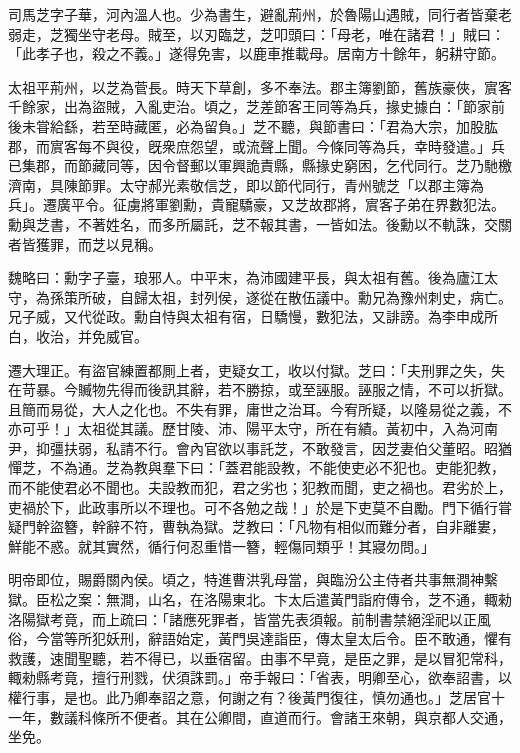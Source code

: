 
\begin{pinyinscope}
司馬芝字子華，河內溫人也。少為書生，避亂荊州，於魯陽山遇賊，同行者皆棄老弱走，芝獨坐守老母。賊至，以刃臨芝，芝叩頭曰：「母老，唯在諸君！」賊曰：「此孝子也，殺之不義。」遂得免害，以鹿車推載母。居南方十餘年，躬耕守節。

太祖平荊州，以芝為菅長。時天下草創，多不奉法。郡主簿劉節，舊族豪俠，賔客千餘家，出為盜賊，入亂吏治。頃之，芝差節客王同等為兵，掾史據白：「節家前後未甞給繇，若至時藏匿，必為留負。」芝不聽，與節書曰：「君為大宗，加股肱郡，而賔客每不與役，旣衆庶怨望，或流聲上聞。今條同等為兵，幸時發遣。」兵已集郡，而節藏同等，因令督郵以軍興詭責縣，縣掾史窮困，乞代同行。芝乃馳檄濟南，具陳節罪。太守郝光素敬信芝，即以節代同行，青州號芝「以郡主簿為兵」。遷廣平令。征虜將軍劉勳，貴寵驕豪，又芝故郡將，賔客子弟在界數犯法。勳與芝書，不著姓名，而多所屬託，芝不報其書，一皆如法。後勳以不軌誅，交關者皆獲罪，而芝以見稱。

魏略曰：勳字子臺，琅邪人。中平末，為沛國建平長，與太祖有舊。後為廬江太守，為孫策所破，自歸太祖，封列侯，遂從在散伍議中。勳兄為豫州刺史，病亡。兄子威，又代從政。勳自恃與太祖有宿，日驕慢，數犯法，又誹謗。為李申成所白，收治，并免威官。

遷大理正。有盜官練置都厠上者，吏疑女工，收以付獄。芝曰：「夫刑罪之失，失在苛暴。今贓物先得而後訊其辭，若不勝掠，或至誣服。誣服之情，不可以折獄。且簡而易從，大人之化也。不失有罪，庸世之治耳。今宥所疑，以隆易從之義，不亦可乎！」太祖從其議。歷甘陵、沛、陽平太守，所在有績。黃初中，入為河南尹，抑彊扶弱，私請不行。會內官欲以事託芝，不敢發言，因芝妻伯父董昭。昭猶憚芝，不為通。芝為教與羣下曰：「蓋君能設教，不能使吏必不犯也。吏能犯教，而不能使君必不聞也。夫設教而犯，君之劣也；犯教而聞，吏之禍也。君劣於上，吏禍於下，此政事所以不理也。可不各勉之哉！」於是下吏莫不自勵。門下循行甞疑門幹盜簪，幹辭不符，曹執為獄。芝教曰：「凡物有相似而難分者，自非離婁，鮮能不惑。就其實然，循行何忍重惜一簪，輕傷同類乎！其寢勿問。」

明帝即位，賜爵關內侯。頃之，特進曹洪乳母當，與臨汾公主侍者共事無澗神繫獄。臣松之案：無澗，山名，在洛陽東北。卞太后遣黃門詣府傳令，芝不通，輙勑洛陽獄考竟，而上疏曰：「諸應死罪者，皆當先表須報。前制書禁絕淫祀以正風俗，今當等所犯妖刑，辭語始定，黃門吳達詣臣，傳太皇太后令。臣不敢通，懼有救護，速聞聖聽，若不得已，以垂宿留。由事不早竟，是臣之罪，是以冒犯常科，輙勑縣考竟，擅行刑戮，伏須誅罰。」帝手報曰：「省表，明卿至心，欲奉詔書，以權行事，是也。此乃卿奉詔之意，何謝之有？後黃門復往，慎勿通也。」芝居官十一年，數議科條所不便者。其在公卿間，直道而行。會諸王來朝，與京都人交通，坐免。


\end{pinyinscope}
